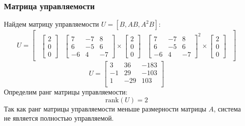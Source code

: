 \subsubsection{Матрица управляемости}
Найдем матрицу управляемости $U = [B, AB, A^2B]$:
\begin{equation}
    U = \begin{bmatrix} 
        \begin{array}{c|c|c}
            \begin{bmatrix}
                2 \\
                0 \\
                0
            \end{bmatrix} & 
            \begin{bmatrix}
                7 & -7 & 8 \\
                6 & -5 & 6 \\
                -6 & 4 & -7
            \end{bmatrix} \times 
            \begin{bmatrix}
                2 \\
                0 \\
                0
            \end{bmatrix} &
            \begin{bmatrix}
                7 & -7 & 8 \\
                6 & -5 & 6 \\
                -6 & 4 & -7
            \end{bmatrix}^2 \times
            \begin{bmatrix}
                2 \\
                0 \\
                0
            \end{bmatrix}
        \end{array}   
    \end{bmatrix}
\end{equation}
\begin{equation}
    U = \begin{bmatrix}
    3 & 36 & -183 \\ 
    -1 & 29 & -103 \\ 
    1 & -29 & 103 \\ 
    \end{bmatrix}
\end{equation}
Определим ранг матрицы управляемости:
\begin{equation}
    \text{rank}(U) = 2
\end{equation}
Так как ранг матрицы управляемости меньше размерности матрицы $A$, система не является полностью управляемой. 

